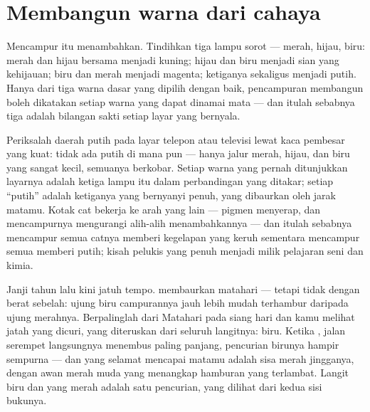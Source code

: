 \section{Membangun warna dari cahaya}

\begin{example}\label{ex:g8:colors-spectra:additive}
Mencampur \emph{} itu menambahkan. Tindihkan tiga lampu sorot
--- merah, hijau, biru: merah dan hijau bersama menjadi kuning; hijau
dan biru menjadi sian yang kehijauan; biru dan merah menjadi magenta;
ketiganya sekaligus menjadi putih. Hanya dari tiga warna dasar yang
dipilih dengan baik, pencampuran  membangun boleh dikatakan
setiap warna yang dapat dinamai mata --- dan itulah sebabnya tiga
adalah bilangan sakti setiap layar yang bernyala.
\end{example}

\begin{example}\label{ex:g8:colors-spectra:screen}
Periksalah daerah putih pada layar telepon atau televisi lewat kaca
pembesar yang kuat: tidak ada putih di mana pun --- hanya jalur merah,
hijau, dan biru yang sangat kecil, semuanya berkobar. Setiap warna
yang pernah ditunjukkan layarnya adalah ketiga lampu itu dalam
perbandingan yang ditakar; setiap ``putih'' adalah ketiganya yang
bernyanyi penuh, yang dibaurkan oleh jarak matamu. Kotak cat bekerja
ke arah yang lain --- pigmen menyerap, dan mencampurnya mengurangi
 alih-alih menambahkannya --- dan itulah sebabnya mencampur
semua catnya memberi kegelapan yang keruh sementara mencampur semua
 memberi putih; kisah pelukis yang penuh menjadi milik
pelajaran seni dan kimia.
\end{example}

\begin{remark}\label{rem:g8:colors-spectra:sunset}
Janji  tahun lalu kini jatuh tempo.  membaurkan
 matahari --- tetapi tidak dengan berat sebelah: ujung biru
campurannya jauh lebih mudah terhambur daripada ujung merahnya.
Berpalinglah dari Matahari pada siang hari dan kamu melihat jatah yang
dicuri, yang diteruskan dari seluruh langitnya: biru. Ketika , jalan serempet  langsungnya menembus  paling
panjang, pencurian birunya hampir sempurna --- dan yang selamat
mencapai matamu adalah sisa merah jingganya, dengan awan merah muda
yang menangkap hamburan yang terlambat. Langit biru dan  yang merah adalah satu pencurian, yang dilihat dari kedua
sisi bukunya.
\end{remark}

